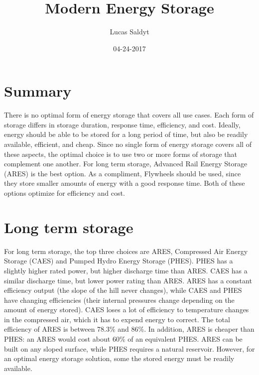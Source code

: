 \documentclass{article}
\title{Modern Energy Storage}
\date{04-24-2017}
\author{Lucas Saldyt}
\begin{document}
\maketitle
{}
\newpage
{}

\section{Summary}

There is no optimal form of energy storage that covers all use cases. Each form of storage differs in storage duration, response time, efficiency, and cost. Ideally, energy should be able to be stored for a long period of time, but also be readily available, efficient, and cheap. Since no single form of energy storage covers all of these aspects, the optimal choice is to use two or more forms of storage that complement one another. For long term storage, Advanced Rail Energy Storage (ARES) is the best option.  As a compliment, Flywheels should be used, since they store smaller amounts of energy with a good response time. Both of these options optimize for efficiency and cost.


\section{Long term storage}

For long term storage, the top three choices are ARES, Compressed Air Energy Storage (CAES) and Pumped Hydro Energy Storage (PHES). PHES has a slightly higher rated power, but higher discharge time than ARES. CAES has a similar discharge time, but lower power rating than ARES. ARES has a constant efficiency output (the slope of the hill never changes), while CAES and PHES have changing efficiencies (their internal pressures change depending on the amount of energy stored). CAES loses a lot of efficiency to temperature changes in the compressed air, which it has to expend energy to correct. The total efficiency of ARES is between 78.3\% and 86\%. In addition, ARES is cheaper than PHES: an ARES would cost about 60\% of an equivalent PHES. ARES can be built on any sloped surface, while PHES requires a natural reservoir. However, for an optimal energy storage solution, some the stored energy must be readily available.
\end{document}
